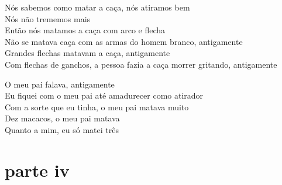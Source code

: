  \smallskip
 \begin{center}\end{center}
 \smallskip
 
\noindent Nós sabemos como matar a caça, nós atiramos bem\\
 Nós não trememos mais\\
 Então nós matamos a caça com arco e flecha\\
 Não se matava caça com as armas do homem branco, antigamente\\
 Grandes flechas matavam a caça, antigamente\\
 Com flechas de ganchos, a pessoa fazia a caça morrer gritando, antigamente
 
 \smallskip
 \begin{center}\end{center}
 \smallskip
 
\noindent O meu pai falava, antigamente\\
 Eu fiquei com o meu pai até amadurecer como atirador\\
 Com a sorte que eu tinha, o meu pai matava muito\\
 Dez macacos, o meu pai matava\\
 Quanto a mim, eu só matei três
 
 
 \medskip
\section{parte iv}

